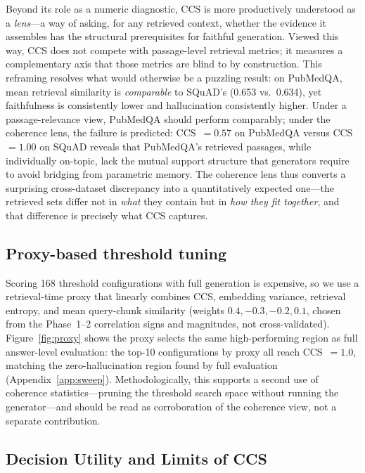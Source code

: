 Beyond its role as a numeric diagnostic, CCS is more productively understood
as a \emph{lens}---a way of asking, for any retrieved context, whether the
evidence it assembles has the structural prerequisites for faithful
generation. Viewed this way, CCS does not compete with passage-level
retrieval metrics; it measures a complementary axis that those metrics are
blind to by construction. This reframing resolves what would otherwise be a
puzzling result: on PubMedQA, mean retrieval similarity is \emph{comparable}
to SQuAD's (0.653 vs.\ 0.634), yet faithfulness is consistently lower and
hallucination consistently higher. Under a passage-relevance view, PubMedQA
should perform comparably; under the coherence lens, the failure is
predicted: CCS~$=0.57$ on PubMedQA versus CCS~$=1.00$ on SQuAD reveals that
PubMedQA's retrieved passages, while individually on-topic, lack the mutual
support structure that generators require to avoid bridging from parametric
memory. The coherence lens thus converts a surprising cross-dataset
discrepancy into a quantitatively expected one---the retrieved sets differ
not in \emph{what} they contain but in \emph{how they fit together}, and
that difference is precisely what CCS captures.

\subsection{Proxy-based threshold tuning}

Scoring 168 threshold configurations with full generation is expensive,
so we use a retrieval-time proxy that linearly combines CCS, embedding
variance, retrieval entropy, and mean query-chunk similarity (weights
$0.4, -0.3, -0.2, 0.1$, chosen from the Phase~1--2 correlation signs and
magnitudes, not cross-validated). Figure~\ref{fig:proxy} shows the proxy
selects the same high-performing region as full answer-level evaluation:
the top-10 configurations by proxy all reach CCS~$=1.0$, matching the
zero-hallucination region found by full evaluation
(Appendix~\ref{app:sweep}). Methodologically, this supports a second use
of coherence statistics---pruning the threshold search space without
running the generator---and should be read as corroboration of the
coherence view, not a separate contribution.

\subsection{Decision Utility and Limits of CCS}
\label{sec:ccs_utility}

